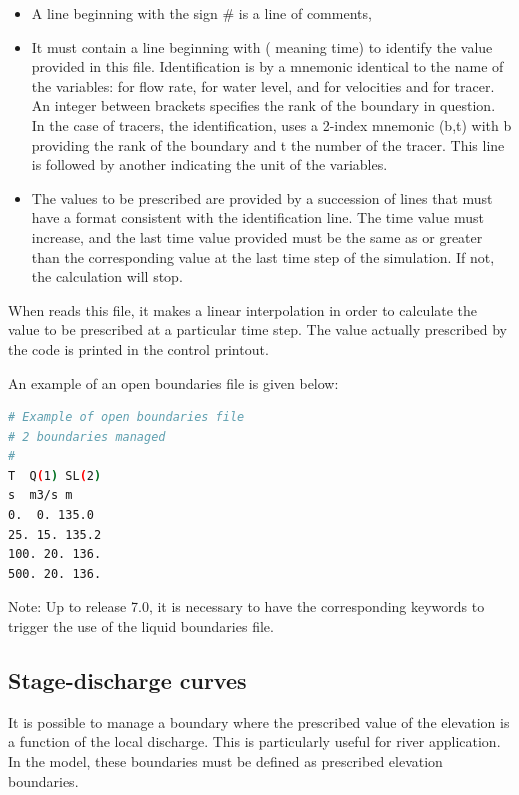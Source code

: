 \begin{itemize}
\item A line beginning with the sign \# is a line of comments,

\item It must contain a line beginning with  ( meaning
time) to identify the value provided in this file.
Identification is by a mnemonic identical to the name of the variables:
 for flow rate,  for water level,  and
 for velocities and  for tracer.
An integer between brackets specifies the rank of the boundary in question.
In the case of tracers, the identification, uses a 2-index mnemonic
(b,t) with b providing the rank of the boundary and t the number of
the tracer.
This line is followed by another indicating the unit of the variables.

\item The values to be prescribed are provided by a succession of lines
that must have a format consistent with the identification line.
The time value must increase, and the last time value provided must be the same
as or greater than the corresponding value at the last time step of the
simulation.
If not, the calculation will stop.
\end{itemize}

When  reads this file, it makes a linear interpolation in order to
calculate the value to be prescribed at a particular time step.
The value actually prescribed by the code is printed in the control printout.

An example of an open boundaries file is given below:
\begin{lstlisting}[language=bash]
# Example of open boundaries file
# 2 boundaries managed
#
T  Q(1) SL(2)
s  m3/s m
0.  0. 135.0
25. 15. 135.2
100. 20. 136.
500. 20. 136.
\end{lstlisting}
\begin{WarningBlock}{Note:}
Up to release 7.0, it is necessary to have the corresponding keywords
 to trigger the use of the liquid boundaries file.
\end{WarningBlock}

\subsection{Stage-discharge curves}
\label{subs:stage:dis:curve}
It is possible to manage a boundary where the prescribed value of the elevation
is a function of the local discharge.
This is particularly useful for river application.
In the model, these boundaries must be defined as prescribed elevation boundaries.

